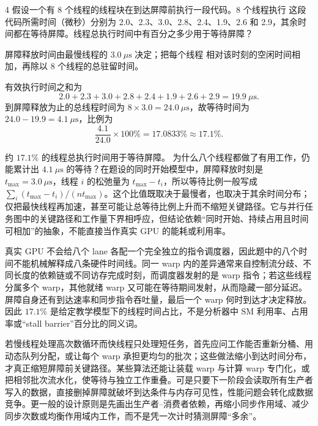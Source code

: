 \begin{solutionexercise}{4}
\problemheading 假设一个有 8 个线程的线程块在到达屏障前执行一段代码。8 个线程执行
这段代码所需时间（微秒）分别为 2.0、2.3、3.0、2.8、2.4、1.9、2.6 和
2.9，其余时间都在等待屏障。线程总执行时间中有百分之多少用于等待屏障？

\approachheading 屏障释放时间由最慢线程的 $3.0\ \mu\mathrm{s}$ 决定；把每个线程
相对该时刻的空闲时间相加，再除以 8 个线程的总驻留时间。

\answerheading 有效执行时间之和为
\[
2.0+2.3+3.0+2.8+2.4+1.9+2.6+2.9=19.9\ \mu\mathrm{s}.
\]
到屏障释放为止的总线程时间为 $8\times3.0=24.0\ \mu\mathrm{s}$，故等待时间为
$24.0-19.9=4.1\ \mu\mathrm{s}$，比例为
\[
 \frac{4.1}{24.0}\times100\%=17.0833\%\approx17.1\%.
\]

\conclusionheading 约 $17.1\%$ 的线程总执行时间用于等待屏障。
\discussionheading
{}
为什么八个线程都做了有用工作，仍能累计出 $4.1\ \mu\mathrm{s}$ 的等待？在题设的同时开始模型中，屏障释放时刻是 $t_{\max}=3.0\ \mu\mathrm{s}$，线程 $i$ 的松弛量为 $t_{\max}-t_i$，所以等待比例一般写成 $\sum_i(t_{\max}-t_i)/(n t_{\max})$。这个比值既取决于最慢者，也取决于其余时间分布；仅把最快线程再加速，甚至可能让总等待比例上升而不缩短关键路径。它与并行任务图中的关键路径和工作量下界相呼应，但结论依赖“同时开始、持续占用且时间可相加”的抽象，不能直接当作真实 GPU 的能耗或利用率。

真实 GPU 不会给八个 lane 各配一个完全独立的指令调度器，因此题中的八个时间不能机械解释成八条硬件时间线。同一 warp 内的差异通常来自控制流分歧、不同长度的依赖链或不同访存完成时刻，而调度器发射的是 warp 指令；若这些线程分属多个 warp，其他就绪 warp 又可能在等待期间发射，从而隐藏一部分延迟。屏障自身还有到达速率和同步指令吞吐量，最后一个 warp 何时到达才决定释放。因此 $17.1\%$ 是给定教学模型下的线程时间占比，不是分析器中 SM 利用率、占用率或“stall barrier”百分比的同义词。

若慢线程处理高次数循环而快线程只处理短任务，首先应问工作能否重新分桶、用动态队列分配，或让每个 warp 承担更均匀的批次；这些做法缩小到达时间分布，才真正缩短屏障前关键路径。某些算法还能让装载 warp 与计算 warp 专门化，或把相邻批次流水化，使等待与独立工作重叠。可是只要下一阶段会读取所有生产者写入的数据，直接删掉屏障就破坏到达条件与内存可见性，性能问题会转化成数据竞争。更一般的设计原则是先画出生产者--消费者依赖，再缩小同步作用域、减少同步次数或均衡作用域内工作，而不是凭一次计时猜测屏障“多余”。


\end{solutionexercise}

